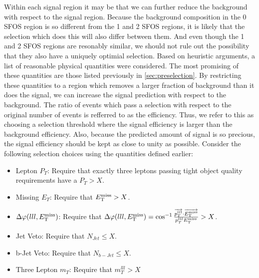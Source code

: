 Within each signal region it may be that we can further reduce the 
background with respect to the signal region. 
Because the background composition in the 0 SFOS region
is so different from the 1 and 2 SFOS regions, it is likely that
the selection which does this will also differ between them. 
And even though the
1 and 2 SFOS regions are resonably similar, we should not rule out
the possibility that they also have a uniquely optimial selection.
Based on heuristic arguments, a list of reasonable physical
quantities were considered. The most promising of these quantities
are those listed previously in \sec\ref{sec:preselection}. 
By restricting these quantities to a region which removes a larger
fraction of background than it does the signal, we can 
increase the signal prediction with respect to the background.
The ratio of events which pass a selection with respect
to the original number of events is refferred to as the 
efficiency.
Thus, we refer to this as choosing a selection threshold where 
the signal efficiency is larger than the background efficiency.
Also, because the predicted amount of signal is so precious,
the signal efficiency should be kept as close to unity as possible.
Consider the following selection choices using the quantities defined
earlier:
\begin{itemize}
\item Lepton $P_{T}$:  Require that exactly three leptons passing tight object quality requirements have a $P_{T} > X$.
\item Missing $E_{T}$:  Require that $E_{\mathrm{T}}^{\mathrm{miss}} > X$.
\item $\Delta\varphi(lll,E_{\mathrm{T}}^{\mathrm{miss}})$:  Require that $\Delta\varphi(lll,E_{\mathrm{T}}^{\mathrm{miss}}) = \cos^{-1}\frac{ \overrightarrow{p_{T}^{lll}}\cdot\overrightarrow{E_{\mathrm{T}}^{\mathrm{miss}}} }{ p_{T}^{lll}E_{\mathrm{T}}^{\mathrm{miss}} } > X$.
\item Jet Veto: Require that $N_{Jet} \leq X$.
\item b-Jet Veto: Require that $N_{b-Jet} \leq X$.
\item Three Lepton $m_{T}$: Require that $m_{T}^{lll} > X$
\end{itemize}

